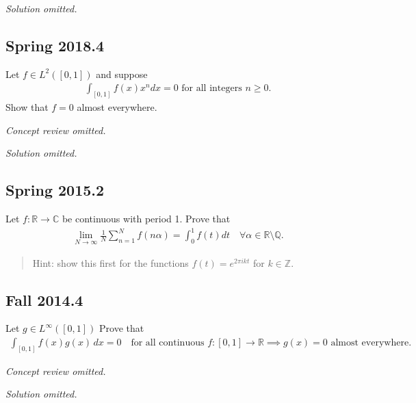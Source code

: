 \emph{Solution omitted.}

\hypertarget{spring-2018.4}{%
\subsection{Spring 2018.4}\label{spring-2018.4}}

Let \(f\in L^2([0, 1])\) and suppose
\begin{align*}
\int _{[0,1]} f(x) x^{n} d x=0 \text { for all integers } n \geq 0.
\end{align*}
Show that \(f = 0\) almost everywhere.

\emph{Concept review omitted.}

\emph{Solution omitted.}

\hypertarget{spring-2015.2}{%
\subsection{Spring 2015.2}\label{spring-2015.2}}

Let \(f: {\mathbb{R}}\to {\mathbb{C}}\) be continuous with period 1.
Prove that
\begin{align*}
\lim _{N \rightarrow \infty} \frac{1}{N} \sum_{n=1}^{N} f(n \alpha)=\int_{0}^{1} f(t) d t \quad \forall \alpha \in {\mathbb{R}}\setminus{\mathbb{Q}}.
\end{align*}

\begin{quote}
Hint: show this first for the functions \(f(t) = e^{2\pi i k t}\) for
\(k\in {\mathbb{Z}}\).
\end{quote}

\hypertarget{fall-2014.4}{%
\subsection{Fall 2014.4}\label{fall-2014.4}}

\begin{problem}[?]

Let \(g\in L^\infty([0, 1])\) Prove that
\begin{align*}
\int _{[0,1]} f(x) g(x)\, dx = 0 
\quad\text{for all continuous } f:[0, 1] \to {\mathbb{R}}
\implies g(x) = 0 \text{ almost everywhere. }
\end{align*}

\end{problem}

\emph{Concept review omitted.}

\emph{Solution omitted.}

